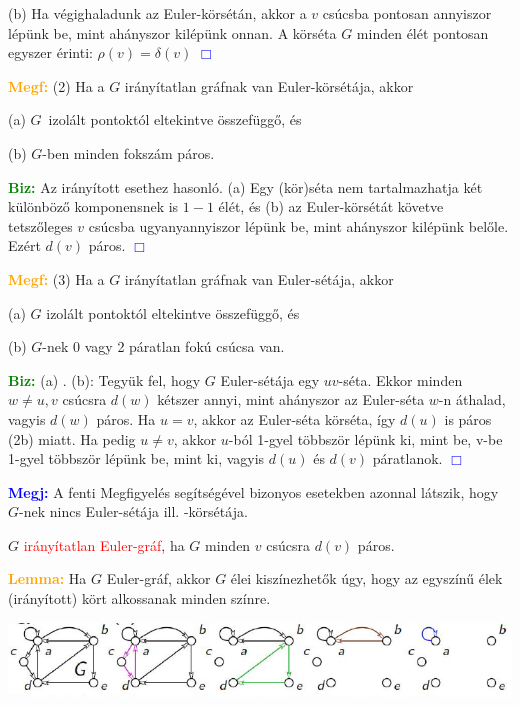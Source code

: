 \documentclass[../../szobeli.tex]{subfiles}
\begin{document}
\begin{itemize}
        (b) Ha végighaladunk az Euler-körsétán, akkor a $v$ csúcsba pontosan annyiszor lépünk be, mint ahányszor kilépünk onnan. A körséta $G$ minden élét pontosan egyszer érinti: $\rho(v) = \delta(v)$  \textcolor{blue}{$\Box$} 

        \textcolor{orange}{\textbf{Megf:}} (2) Ha a $G$ irányítatlan gráfnak van Euler-körsétája, akkor 

            (a) $G$ izolált pontoktól eltekintve összefüggő, és

            (b) $G$-ben minden fokszám páros.

        \textcolor{green}{\textbf{Biz:}} Az irányított esethez hasonló. (a) Egy (kör)séta nem tartalmazhatja két különböző komponensnek is $1-1$ élét, és (b) az Euler-körsétát követve tetszőleges $v$ csúcsba ugyanyannyiszor lépünk be, mint ahányszor kilépünk belőle. Ezért $d(v)$ páros.  \textcolor{blue}{$\Box$} 

        \textcolor{orange}{\textbf{Megf:}} (3) Ha a $G$ irányítatlan gráfnak van Euler-sétája, akkor 

            (a) $G$ izolált pontoktól eltekintve összefüggő, és

            (b) $G$-nek 0 vagy 2 páratlan fokú csúcsa van.

        \textcolor{green}{\textbf{Biz:}} (a) \checkmark. (b): Tegyük fel, hogy $G$ Euler-sétája egy $uv$-séta. Ekkor minden $w \neq u,v$ csúcsra $d(w)$ kétszer annyi, mint ahányszor az Euler-séta $w$-n áthalad, vagyis $d(w)$ páros. Ha $u = v$, akkor az Euler-séta körséta, így $d(u)$ is páros (2b) miatt. Ha pedig $u \neq v$, akkor $u$-ból 1-gyel többször lépünk ki, mint be, v-be 1-gyel többször lépünk be, mint ki, vagyis $d(u)$ és $d(v)$ páratlanok.  \textcolor{blue}{$\Box$}

        \textcolor{blue}{\textbf{Megj:}} A fenti Megfigyelés segítségével bizonyos esetekben azonnal látszik, hogy $G$-nek nincs Euler-sétája ill. -körsétája.

        $G$ \textcolor{red}{irányítatlan Euler-gráf}, ha $G$ minden $v$ csúcsra $d(v)$ páros.

        \textcolor{orange}{\textbf{Lemma:}} Ha $G$ Euler-gráf, akkor $G$ élei kiszínezhetők úgy, hogy az egyszínű élek (irányított) kört alkossanak minden színre.

        \includegraphics[width=\textwidth]{img/2.png}


\end{itemize}
\end{document}
